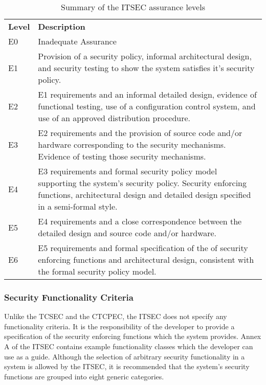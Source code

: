     \begin{table}[H]
        \begin{center}
        \begin{tabular}{|>{\sffamily}p{1cm}|>{\sffamily}p{12cm}|} \hline
            \multicolumn{2}{|c|}{\bfseries{\sffamily{ITSEC}}} \\ \hline
            \bfseries{Level} & \bfseries{Description} \\ \hline
            E0 & Inadequate Assurance \\ \hline
            E1 & Provision of a security policy, 
                 informal architectural design, and security testing
                 to show the system satisfies it's security policy.
                 \\ \hline
            E2 & E1 requirements and an informal detailed design,
                 evidence of functional testing, use of a configuration
                 control system, and use of an approved distribution
                 procedure.
                 \\ \hline
            E3 & E2 requirements and the provision of source code
                 and/or hardware corresponding to the security 
                 mechanisms. Evidence of testing those security
                 mechanisms. 
                 \\ \hline
            E4 & E3 requirements and formal security policy model
                    supporting the system's security policy. 
                    Security enforcing functions, architectural design
                    and detailed design specified in a semi-formal
                    style.
                    \\ \hline
            E5 & E4 requirements and a close correspondence between the 
                    detailed design and source code and/or hardware.
                    \\ \hline
            E6 & E5 requirements and formal specification of the of 
                    security enforcing functions and architectural
                    design, consistent with the formal security
                    policy model.
                    \\ \hline
        \end{tabular}
        \end{center} 
    \caption{Summary of the ITSEC assurance levels} \label{table:itsec-class-table}
    \end{table}

    \subsubsection{Security Functionality Criteria}
    Unlike the TCSEC and the CTCPEC, the ITSEC does not specify
    any functionality criteria. It is the responsibility of the developer to provide a specification of the
    security enforcing functions which the system provides. Annex A of the ITSEC contains example
    functionality classes which the developer can use as a guide.
    Although the selection of arbitrary security functionality
    in a system is allowed by the ITSEC, it is recommended that the system's security functions
    are grouped into eight generic categories.

